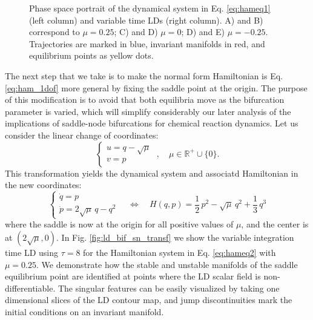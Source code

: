 \documentclass[8pt]{article}
\begin{document}
\begin{figure}[htbp]
\begin{center}
	\end{center}
	\caption{Phase space portrait of the dynamical system in Eq. \eqref{eq:hameq1} (left column) and variable time LDs (right column). A) and B) correspond to $\mu = 0.25$; C) and D) $\mu = 0$; D) and E) $\mu = -0.25$. Trajectories are marked in blue, invariant manifolds in red, and equilibrium points as yellow dots.}
	\label{fig:ld_bif_sn}
\end{figure}

\smallskip

The next step that we take is to make the normal form Hamiltonian is Eq. \eqref{eq:ham_1dof} more general by fixing the saddle point at the origin. The purpose of this modification is to avoid that both equilibria move as the bifurcation parameter is varied, which will simplify considerably our later analysis of the implications of saddle-node bifurcations for chemical reaction dynamics. Let us consider the linear change of coordinates:
\begin{equation}
\begin{cases}
u = q - \sqrt{\mu} \\[.1cm]
v = p
\end{cases}
\; , \quad \mu \in \mathbb{R}^{+} \cup \lbrace0\rbrace .
\end{equation}
This transformation yields the dynamical system and associatd Hamiltonian in the new coordinates:
\begin{equation}
\begin{cases}
\dot{q} = p \\[.1cm]
\dot{p} = 2  \sqrt{\mu} \, q - q^2
\end{cases}
\quad \Leftrightarrow \quad H(q,p) = \frac{1}{2} \, p^2 - \sqrt{\mu} \, q^2 + \frac{1}{3} \, q^3
\label{eq:hameq2}
\end{equation}
where the saddle is now at the origin for all positive values of $\mu$, and the center is at $(2\sqrt{\mu},0)$. In Fig. \ref{fig:ld_bif_sn_transf} we show the variable integration time LD using $\tau = 8$ for the Hamiltonian system in Eq. \eqref{eq:hameq2} with $\mu = 0.25$. We demonstrate how the stable and unstable manifolds of the saddle equilibrium point are identified at points where the LD scalar field is non-differentiable. The singular features can be easily visualized by taking one dimensional slices of the LD contour map, and jump discontinuities mark the initial conditions on an invariant manifold.
\end{document}

